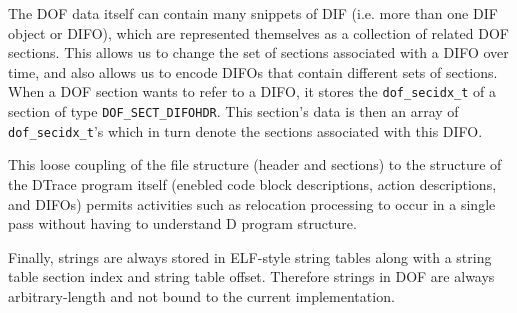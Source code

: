 The DOF data itself can contain many snippets of DIF (i.e. more than
one DIF object or DIFO), which are represented themselves as a
collection of related DOF sections.  This allows us to change the set
of sections associated with a DIFO over time, and also allows us to
encode DIFOs that contain different sets of sections.  When a DOF
section wants to refer to a DIFO, it stores the \verb|dof_secidx_t| of
a section of type \verb|DOF_SECT_DIFOHDR|.  This section's data is
then an array of \verb|dof_secidx_t|'s which in turn denote the
sections associated with this DIFO.

This loose coupling of the file structure (header and sections) to the
structure of the DTrace program itself (enebled code block
descriptions, action descriptions, and DIFOs) permits activities such
as relocation processing to occur in a single pass without having to
understand D program structure.

Finally, strings are always stored in ELF-style string tables along
with a string table section index and string table offset.  Therefore
strings in DOF are always arbitrary-length and not bound to the
current implementation.


